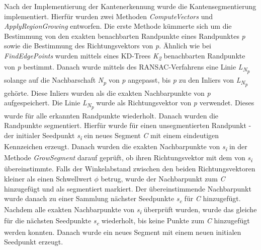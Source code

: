 Nach der Implementierung der Kantenerkennung wurde die Kantensegmentierung implementiert. Hierfür wurden zwei Methoden \textit{ComputeVectors} und \textit{ApplyRegionGrowing} entworfen. Die erste Methode kümmerte sich um die Bestimmung von den exakten benachbarten Randpunkte eines Randpunktes \textit{p} sowie die Bestimmung des Richtungsvektors von \textit{p}. Ähnlich wie bei \textit{FindEdgePoints} wurden mittels eines KD-Trees \textit{K\textsubscript{2}} benachbarten Randpunkte von \textit{p} bestimmt. Danach wurde mittels des RANSAC-Verfahrens eine Linie \textit{L\textsubscript{N\textsubscript{p}}} solange auf die Nachbarschaft \textit{N\textsubscript{p}} von \textit{p} angepasst, bis \textit{p} zu den Inliers von \textit{L\textsubscript{N\textsubscript{p}}} gehörte. Diese Inliers wurden als die exakten Nachbarpunkte von \textit{p} aufgespeichert. Die Linie \textit{L\textsubscript{N\textsubscript{p}}} wurde als Richtungsvektor von \textit{p} verwendet. Dieses wurde für alle erkannten Randpunkte wiederholt. Danach wurden die Randpunkte segmentiert. Hierfür wurde für einen unsegmentierten Randpunkt - der initialer Seedpunkt \textit{s\textsubscript{i}} ein neues Segment \textit{C} mit einem eindeutigen Kennzeichen erzeugt. Danach wurden die exakten Nachbarpunkte von \textit{s\textsubscript{i}} in der Methode \textit{GrowSegment} darauf geprüft, ob ihren Richtungsvektor mit dem von \textit{s\textsubscript{i}} übereinstimmte. Falls der Winkelabstand zwischen den beiden Richtungsvektoren kleiner als einen Schwellwert \textit{$\phi$} betrug, wurde der Nachbarpunkt zum \textit{C} hinzugefügt und als segmentiert markiert. Der übereinstimmende Nachbarpunkt wurde danach zu einer Sammlung nächster Seedpunkte \textit{s\textsubscript{c}} für \textit{C} hinzugefügt. Nachdem alle exakten Nachbarpunkte von \textit{s\textsubscript{i}} überprüft wurden, wurde das gleiche für die nächsten Seedpunkte \textit{s\textsubscript{c}} wiederholt, bis keine Punkte zum \textit{C} hinzugefügt werden konnten. Danach wurde ein neues Segment mit einem neuen initialen Seedpunkt erzeugt.

